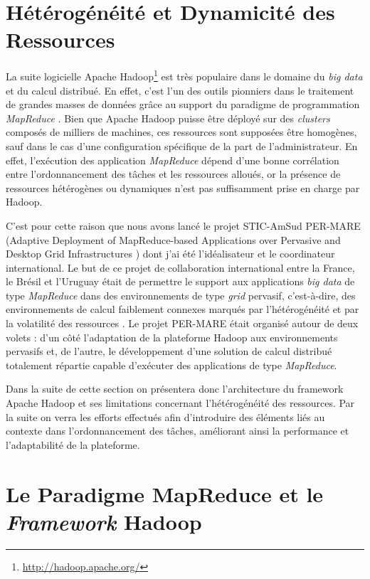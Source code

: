 \section{Hétérogénéité et Dynamicité des Ressources} \label{sec:Guilherme}

La suite logicielle Apache Hadoop\footnote{\url{http://hadoop.apache.org/}} est très populaire dans le domaine du \textit{big data} et du calcul distribué. En effet, c'est l'un des outils pionniers dans le traitement de grandes masses de données grâce au support du paradigme de programmation \textit{MapReduce} \cite{Dean2008}. Bien que Apache Hadoop puisse être déployé sur des \textit{clusters} composés de milliers de machines, ces ressources sont supposées être homogènes, sauf dans le cas d'une configuration spécifique de la part de l'administrateur. En effet, l'exécution des application \textit{MapReduce} dépend d'une bonne corrélation entre l'ordonnancement des tâches et les ressources alloués, or la présence de ressources hétérogènes ou dynamiques n'est pas suffisamment prise en charge par Hadoop. 

C'est pour cette raison que nous avons lancé le projet STIC-AmSud PER-MARE (Adaptive Deployment of MapReduce-based Applications over Pervasive and Desktop Grid Infrastructures \cite{PER-MARE}) dont j'ai été l'idéalisateur et le coordinateur international. Le but de ce projet de collaboration international entre la France, le Brésil et l'Uruguay était de permettre le support aux applications \textit{big data} de type \textit{MapReduce} dans des environnements de type \textit{grid} pervasif, c'est-à-dire, des environnements de calcul faiblement connexes marqués par l'hétérogénéité et par la volatilité des ressources \cite{3PGCIC}. Le projet PER-MARE était organisé autour de deux volets : d'un côté l'adaptation de la plateforme Hadoop aux environnements pervasifs et, de l'autre, le développement d'une solution de calcul distribué totalement répartie capable d'exécuter des applications de type \textit{MapReduce}.
 
Dans la suite de cette section on présentera donc l'architecture du framework Apache Hadoop et ses limitations concernant l'hétérogénéité des ressources. Par la suite on verra les efforts effectués afin d'introduire des éléments liés au contexte dans l'ordonnancement des tâches, améliorant ainsi la performance et l'adaptabilité de la plateforme. 

\section{Le Paradigme MapReduce et le \textit{Framework} Hadoop}

